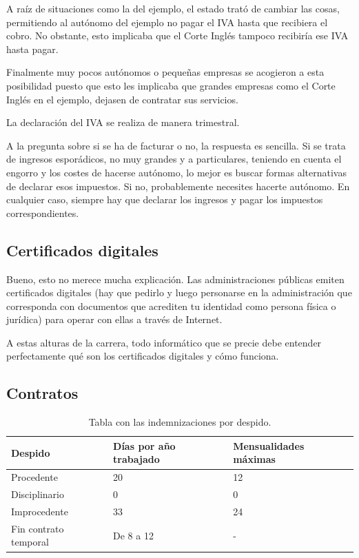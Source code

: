 \documentclass[nochap,palatino,shortheader]{apuntes}
\begin{document}
A raíz de situaciones como la del ejemplo, el estado trató de cambiar las cosas, permitiendo al autónomo del ejemplo no pagar el IVA hasta que recibiera el cobro. No obstante, esto implicaba que el Corte Inglés tampoco recibiría ese IVA hasta pagar.

Finalmente muy pocos autónomos o pequeñas empresas se acogieron a esta posibilidad puesto que esto les implicaba que grandes empresas como el Corte Inglés en el ejemplo, dejasen de contratar sus servicios.

\obs La declaración del IVA se realiza de manera trimestral.

A la pregunta sobre si se ha de facturar o no, la respuesta es sencilla. Si se trata de ingresos esporádicos, no muy grandes y a particulares, teniendo en cuenta el engorro y los costes de hacerse autónomo, lo mejor es buscar formas alternativas de declarar esos impuestos. Si no, probablemente necesites hacerte autónomo. En cualquier caso, siempre hay que declarar los ingresos y pagar los impuestos correspondientes.

\subsection{Certificados digitales}

Bueno, esto no merece mucha explicación. Las administraciones públicas emiten certificados digitales (hay que pedirlo y luego personarse en la administración que corresponda con documentos que acrediten tu identidad como persona física o jurídica) para operar con ellas a través de Internet.

A estas alturas de la carrera, todo informático que se precie debe entender perfectamente qué son los certificados digitales y cómo funciona.

\subsection{Contratos}

\begin{table}[hbtp]
\centering
\begin{tabular}{l|l|l}
\textbf{Despido} & \textbf{Días por año trabajado} & \textbf{Mensualidades máximas} \\ \toprule
Procedente & 20 & 12 \\
Disciplinario & 0 & 0 \\
Improcedente & 33 & 24 \\
Fin contrato temporal & De 8 a 12 & - \\
\end{tabular}
\caption{Tabla con las indemnizaciones por despido.}
\label{tab:Despido}
\end{table}
\end{document}
